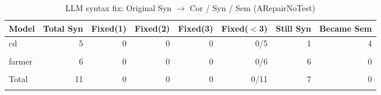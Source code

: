 \begin{table}[h]
\centering
\caption{LLM syntax fix: Original Syn $\rightarrow$ Cor / Syn / Sem (ARepairNoTest)}
\label{tab:syn_fix_arepairnotest}
\begin{tabular}{|l|r|r|r|r|r|r|r|}
\hline
Model & Total Syn & Fixed(1) & Fixed(2) & Fixed(3) & Fixed($<$3) & Still Syn & Became Sem \\
\hline
cd & 5 & 0 & 0 & 0 & 0/5 & 1 & 4 \\\\
\hline
farmer & 6 & 0 & 0 & 0 & 0/6 & 6 & 0 \\\\
\hline
Total & 11 & 0 & 0 & 0 & 0/11 & 7 & 0 \\\\
\hline
\end{tabular}
\end{table}
